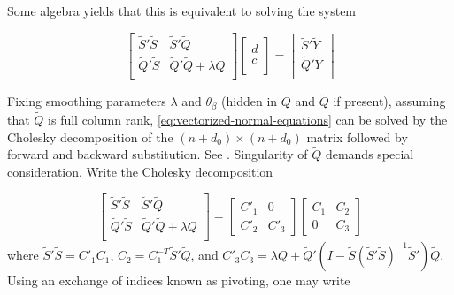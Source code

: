 \documentclass[12pt]{article}
\newcommand{\tildeY}{\tilde{Y}}
\newcommand{\tildeQ}{\tilde{Q}}
\newcommand{\tildeS}{\tilde{S}}
\theoremstyle{definition}
\begin{document}
\noindent
Some algebra yields that this is equivalent to solving the system

\begin{equation} \label{eq:vectorized-normal-equations}
\begin{bmatrix}
\tildeS'\tildeS & \tildeS'\tildeQ \\
\tildeQ'\tildeS & \tildeQ'\tildeQ + \lambda Q\\
\end{bmatrix}
\begin{bmatrix}
d\\
c\\
\end{bmatrix}
= \begin{bmatrix}
\tildeS'\tildeY \\
 \tildeQ'\tildeY\\
\end{bmatrix}
\end{equation}

Fixing smoothing parameters $\lambda$ and $\theta_\beta$ (hidden in $Q$ and $\tildeQ$ if present), assuming that $\tildeQ$ is full column rank, \ref{eq:vectorized-normal-equations} can be solved by the Cholesky decomposition of the $\left( n + d_0 \right) \times \left( n + d_0 \right)$ matrix followed by forward and backward substitution. See \citet{golub2012matrix}. Singularity of $\tildeQ$ demands special consideration. Write the Cholesky decomposition

\begin{equation} \label{eq:normal-equation-cholesky}
\begin{bmatrix}
\tildeS'\tildeS & \tildeS'\tildeQ \\
\tildeQ'\tildeS & \tildeQ'\tildeQ + \lambda Q\\
\end{bmatrix}
= \begin{bmatrix}
C'_1 & 0 \\
C'_2  & C'_3 
\end{bmatrix}
\begin{bmatrix}
C_1 & C_2 \\
0  & C_3 
\end{bmatrix}
\end{equation}
\noindent
where $\tildeS'\tildeS = C'_1 C_1$, $C_2 = C_1^{-T} \tildeS' \tildeQ$, and $C'_3 C_3 = \lambda Q +  \tildeQ'\left( I - \tildeS\left( \tildeS' \tildeS \right)^{-1} \tildeS' \right)\tildeQ$. Using an exchange of indices known as pivoting, one may write 
\end{document}
